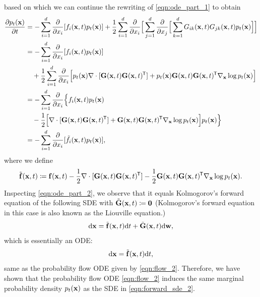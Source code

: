 based on which we can continue the rewriting of \cref{eqn:ode_part_1} to obtain
\begin{align}
    \frac{\partial p_t(\mathbf{x})}{\partial t} &= -\sum_{i=1}^d \frac{\partial}{\partial x_i}[f_i(\mathbf{x}, t) p_t(\mathbf{x})] + \frac{1}{2}\sum_{i=1}^d \frac{\partial}{\partial x_i} \Big[ \sum_{j=1}^d \frac{\partial}{\partial x_j}\Big[\sum_{k=1}^d G_{ik}(\mathbf{x}, t) G_{jk}(\mathbf{x}, t) p_t(\mathbf{x})\Big]\Big]\notag \\
     &= -\sum_{i=1}^d \frac{\partial}{\partial x_i}[f_i(\mathbf{x}, t) p_t(\mathbf{x})] \notag \\
     &\quad + \frac{1}{2}\sum_{i=1}^d \frac{\partial}{\partial x_i} \Big[ p_t(\mathbf{x}) \nabla \cdot [\mathbf{G}(\mathbf{x}, t)\mathbf{G}(\mathbf{x}, t)^{\mkern-1.5mu\mathsf{T}}] + p_t(\mathbf{x}) \mathbf{G}(\mathbf{x}, t)\mathbf{G}(\mathbf{x}, t)^{\mkern-1.5mu\mathsf{T}} \nabla_{\mathbf{x}} \log p_t(\mathbf{x}) \Big]\notag \\
     &= -\sum_{i=1}^d \frac{\partial}{\partial x_i}\Big\{ f_i(\mathbf{x}, t)p_t(\mathbf{x}) \notag \\
     &\quad - \frac{1}{2} \Big[ \nabla \cdot [\mathbf{G}(\mathbf{x}, t)\mathbf{G}(\mathbf{x}, t)^{\mkern-1.5mu\mathsf{T}}] +  \mathbf{G}(\mathbf{x}, t)\mathbf{G}(\mathbf{x}, t)^{\mkern-1.5mu\mathsf{T}} \nabla_{\mathbf{x}} \log p_t(\mathbf{x}) \Big] p_t(\mathbf{x}) \Big\}\notag \\
     &= -\sum_{i=1}^d \frac{\partial}{\partial x_i} [\tilde{f}_i(\mathbf{x}, t)p_t(\mathbf{x})],\label{eqn:ode_part_2}
\end{align}
where we define
\begin{align*}
    \tilde{\mathbf{f}}(\mathbf{x}, t) \coloneqq \mathbf{f}(\mathbf{x}, t) - \frac{1}{2} \nabla \cdot [\mathbf{G}(\mathbf{x}, t)\mathbf{G}(\mathbf{x}, t)^{\mkern-1.5mu\mathsf{T}}] - \frac{1}{2} \mathbf{G}(\mathbf{x}, t)\mathbf{G}(\mathbf{x}, t)^{\mkern-1.5mu\mathsf{T}} \nabla_{\mathbf{x}} \log p_t(\mathbf{x}).
\end{align*}
Inspecting \cref{eqn:ode_part_2}, we observe that it equals Kolmogorov's forward equation of the following SDE with $\tilde{\mathbf{G}}(\mathbf{x}, t) \coloneqq \mathbf{0}$ (Kolmogorov's forward equation in this case is also known as the Liouville equation.)
\begin{align*}
    \mathrm{d} \mathbf{x} = \tilde{\mathbf{f}}(\mathbf{x}, t) \mathrm{d} t + \tilde{\mathbf{G}}(\mathbf{x}, t) \mathrm{d} \mathbf{w},
\end{align*}
which is essentially an ODE:
\begin{align*}
    \mathrm{d} \mathbf{x} = \tilde{\mathbf{f}}(\mathbf{x}, t) \mathrm{d} t,
\end{align*}
same as the probability flow ODE given by \cref{eqn:flow_2}. Therefore, we have shown that the probability flow ODE \cref{eqn:flow_2} induces the same marginal probability density $p_t(\mathbf{x})$ as the SDE in \cref{eqn:forward_sde_2}.

